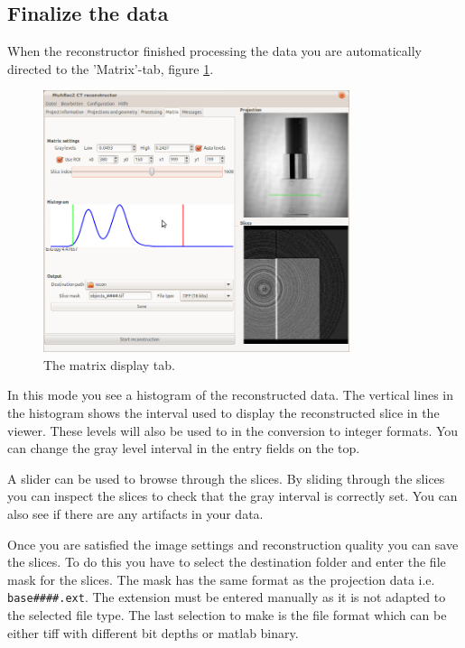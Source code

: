 \documentclass[a4paper]{scrreprt}
\begin{document}
\subsection{Finalize the data}
When the reconstructor finished processing the data you are automatically
directed to the 'Matrix'-tab, figure \ref{fig_matrixtab}.
\begin{figure}
 \centering
\includegraphics[width=0.8\textwidth]{figures/MatrixTab.png}
\caption{The matrix display tab.}\label{fig_matrixtab}
\end{figure}


In this mode you see a histogram of the
reconstructed data. The vertical lines in the histogram shows the interval used
to display the reconstructed slice in the viewer. These levels will also be used
to in the conversion to integer formats. You can change the gray level interval
in the entry fields on the top.

A slider can be used to browse through the slices. By sliding through the slices
you can inspect the slices to check that the gray interval is correctly set. You
can also see if there are any artifacts in your data.

Once you are satisfied the image settings and reconstruction quality you can
save the slices. To do this you have to select the destination folder and enter
the file mask for the slices. The mask has the same format as the projection
data i.e. \verb+base####.ext+. The extension must be entered manually as it is
not adapted to the selected file type. The last selection to make is the file
format which can be either tiff with different bit depths or matlab binary.
\end{document}
